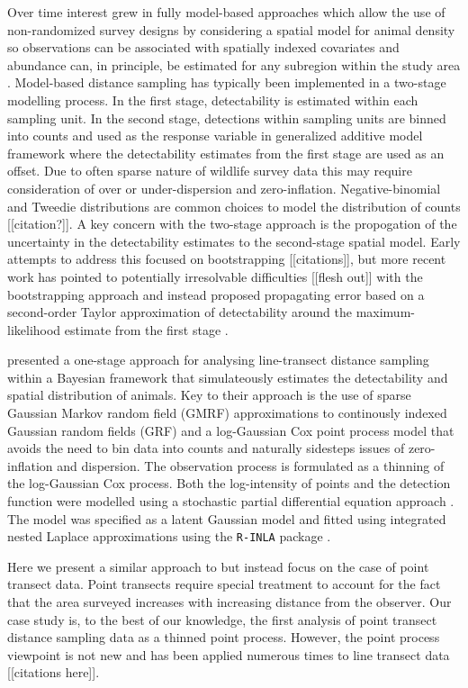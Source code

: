 \documentclass[preprint,12pt]{elsarticle}
\begin{document}
Over time interest grew in fully model-based approaches which allow the use of non-randomized survey designs by considering a spatial model for animal density so observations can be associated with spatially indexed covariates and abundance can, in principle, be estimated for any subregion within the study area \citep{johnson_model-based_2010, buckland_model-based_2016, miller_spatial_2013}.  Model-based distance sampling has typically been implemented in a two-stage modelling process.  In the first stage, detectability is estimated within each sampling unit.  In the second stage, detections within sampling units are binned into counts and used as the response variable in generalized additive model framework where the detectability estimates from the first stage are used as an offset.  Due to often sparse nature of wildlife survey data this may require consideration of over or under-dispersion and zero-inflation.  Negative-binomial and Tweedie distributions are common choices to model the distribution of counts [[citation?]].
A key concern with the two-stage approach is the propogation of the uncertainty in the detectability estimates to the second-stage spatial model.  Early attempts to address this focused on bootstrapping [[citations]], but more recent work has pointed to potentially irresolvable difficulties  [[flesh out]] with the bootstrapping approach and instead proposed propagating error based on a second-order Taylor approximation of detectability around the maximum-likelihood estimate from the first stage \citep{bravington_reliable_2018-1}.

\citet{yuan_point_2017} presented a one-stage approach for analysing line-transect distance sampling within a Bayesian framework that simulateously estimates the detectability
and spatial distribution of animals.  Key to their approach is the use of sparse Gaussian Markov random field (GMRF) approximations to continously indexed Gaussian random fields (GRF) and a log-Gaussian Cox point process model that avoids the need to bin data into counts and naturally sidesteps issues of zero-inflation and dispersion.  The observation process is formulated as a thinning of the log-Gaussian Cox process.  Both the log-intensity of points and the detection function were modelled using a stochastic partial differential equation approach \citep{lindgren_explicit_2011}.  The model was specified as a latent Gaussian model and fitted using integrated nested Laplace approximations using the \texttt{R-INLA} package \citep{rue_approximate_2009}.

Here we present a similar approach to \citet{yuan_point_2017} but instead focus on the case of point transect data.  Point transects require special treatment to account for the fact that the area surveyed increases with increasing distance from the observer.  Our case study is, to the best of our knowledge, the first analysis of point transect distance sampling data as a thinned point process.  However, the point process viewpoint is not new and has been applied numerous times to line transect data [[citations here]].
\end{document}
